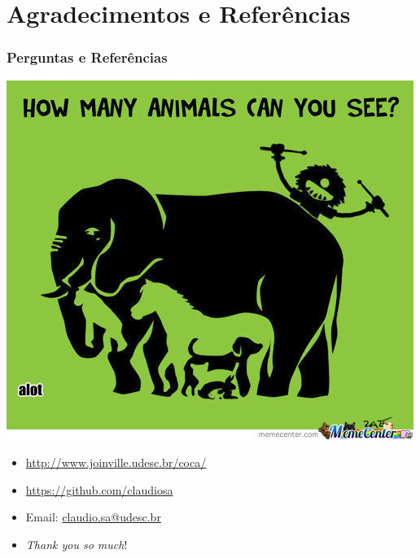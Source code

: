 \documentclass{beamer}
\begin{document}


\section{Agradecimentos e Referências}

\begin{frame} [allowframebreaks=0.9]
\frametitle{Perguntas e Referências}
  
  \begin{center}
   \includegraphics[scale=0.35,keepaspectratio]{figures/test_intelligence01.jpg} 
  \end{center} 

\vspace{-1cm}

\begin{block}{}
  \begin{itemize}
  \item \url{http://www.joinville.udesc.br/coca/}
  
  \item \url{https://github.com/claudiosa}

  \item Email: \url{claudio.sa@udesc.br}


  \item \textit{Thank you so much}!

  \end{itemize}
  \end{block}

\end{frame}


\end{document}
